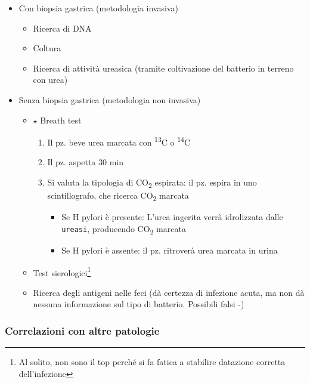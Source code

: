 \documentclass[italian,]{article}
\providecommand{\tightlist}{%
  \setlength{\itemsep}{0pt}\setlength{\parskip}{0pt}}
\newcommand{\goldstandard}{\textcircled{$\star$} }                      %
\begin{document}
\begin{itemize}
\tightlist
\item
  Con biopsia gastrica (metodologia invasiva)

  \begin{itemize}
  \tightlist
  \item
    Ricerca di DNA
  \item
    Coltura
  \item
    Ricerca di attività ureasica (tramite coltivazione del batterio in
    terreno con urea)
  \end{itemize}
\item
  Senza biopsia gastrica (metodologia non invasiva)

  \begin{itemize}
  \tightlist
  \item
    \goldstandard Breath test

    \begin{enumerate}
    \def\labelenumi{\arabic{enumi}.}
    \tightlist
    \item
      Il pz. beve urea marcata con \textsuperscript{13}C o
      \textsuperscript{14}C
    \item
      Il pz. aspetta 30 min
    \item
      Si valuta la tipologia di CO\textsubscript{2} espirata: il pz.
      espira in uno scintillografo, che ricerca CO\textsubscript{2}
      marcata

      \begin{itemize}
      \tightlist
      \item
        Se H pylori è presente: L'urea ingerita verrà idrolizzata dalle
        \texttt{ureasi}, producendo CO\textsubscript{2} marcata
      \item
        Se H pylori è assente: il pz. ritroverà urea marcata in urina
      \end{itemize}
    \end{enumerate}
  \item
    Test sierologici\footnote{Al solito, non sono il top perché si fa
      fatica a stabilire datazione corretta dell'infezione}
  \item
    Ricerca degli antigeni nelle feci (dà certezza di infezione acuta,
    ma non dà nessuna informazione sul tipo di batterio. Possibili falsi
    -)
  \end{itemize}
\end{itemize}

\hypertarget{correlazioni-con-altre-patologie}{%
\subsubsection{Correlazioni con altre
patologie}\label{correlazioni-con-altre-patologie}}
\end{document}

